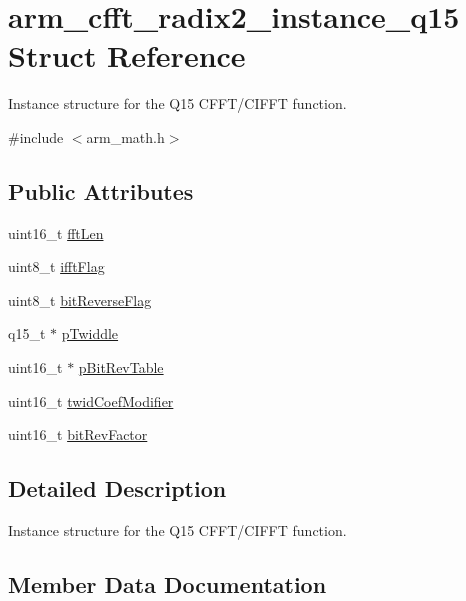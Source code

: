 \hypertarget{structarm__cfft__radix2__instance__q15}{}\section{arm\+\_\+cfft\+\_\+radix2\+\_\+instance\+\_\+q15 Struct Reference}
\label{structarm__cfft__radix2__instance__q15}


Instance structure for the Q15 C\+F\+F\+T/\+C\+I\+F\+FT function.  




{\ttfamily \#include $<$arm\+\_\+math.\+h$>$}

\subsection*{Public Attributes}
\begin{DoxyCompactItemize}
\item 
uint16\+\_\+t \hyperlink{structarm__cfft__radix2__instance__q15_a874085647351dcf3f0de39d2b1d49744}{fft\+Len}
\item 
uint8\+\_\+t \hyperlink{structarm__cfft__radix2__instance__q15_ab5c073286bdd2f6e2bf783ced36bf1de}{ifft\+Flag}
\item 
uint8\+\_\+t \hyperlink{structarm__cfft__radix2__instance__q15_af8300c1f60caa21e6b44b9240ab5af19}{bit\+Reverse\+Flag}
\item 
q15\+\_\+t $\ast$ \hyperlink{structarm__cfft__radix2__instance__q15_a3809dd15e7cbf1a054c728cfbbb0cc5a}{p\+Twiddle}
\item 
uint16\+\_\+t $\ast$ \hyperlink{structarm__cfft__radix2__instance__q15_ab88afeff6493be3c8b5e4530efa82d51}{p\+Bit\+Rev\+Table}
\item 
uint16\+\_\+t \hyperlink{structarm__cfft__radix2__instance__q15_a6f2ab87fb4c568656e1f92f687b5c850}{twid\+Coef\+Modifier}
\item 
uint16\+\_\+t \hyperlink{structarm__cfft__radix2__instance__q15_a8722720c542cabd41df83fe88ef4f4cb}{bit\+Rev\+Factor}
\end{DoxyCompactItemize}


\subsection{Detailed Description}
Instance structure for the Q15 C\+F\+F\+T/\+C\+I\+F\+FT function. 

\subsection{Member Data Documentation}
